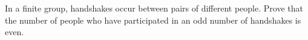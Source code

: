 In a finite group, handshakes occur between pairs of different people. Prove that the number of people who have participated in an odd number of handshakes is even.
